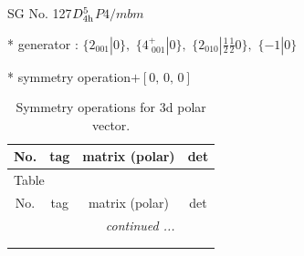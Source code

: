 \documentclass[fleqn,8pt]{jsarticle}
\begin{document}
\setcounter{MaxMatrixCols}{32}

\renewcommand{\tablename}{Table~}
\renewcommand{\figurename}{Figure~}
\begin{center}
\LARGE
SG No. 127\quad$D_{\rm 4h}^{5}$\quad$P4/mbm$\quad[ tetragonal ]
\end{center}

* generator : $\{2{}_{001}|0\},\,\,\{4^{+}_{\,\,001}|0\},\,\,\{2{}_{010}|\frac{1}{2} \frac{1}{2} 0\},\,\,\{-1|0\}$

* symmetry operation\quad$+\left[ 0,\, 0,\, 0 \right]$
\renewcommand{\arraystretch}{1.3}
\begin{longtable}{cccc}
\caption{Symmetry operations for 3d polar vector.}
 \\
 \hline \hline
No. & tag & matrix (polar) & det \\ \hline \endfirsthead

\multicolumn{3}{l}{\tablename\ \thetable{}} \\
 \hline \hline
No. & tag & matrix (polar) & det \\ \hline \endhead

 \hline \hline
\multicolumn{3}{r}{\footnotesize\it continued ...} \\ \endfoot

 \hline \hline
\multicolumn{3}{r}{} \\ \endlastfoot


\end{longtable}
\end{document}
